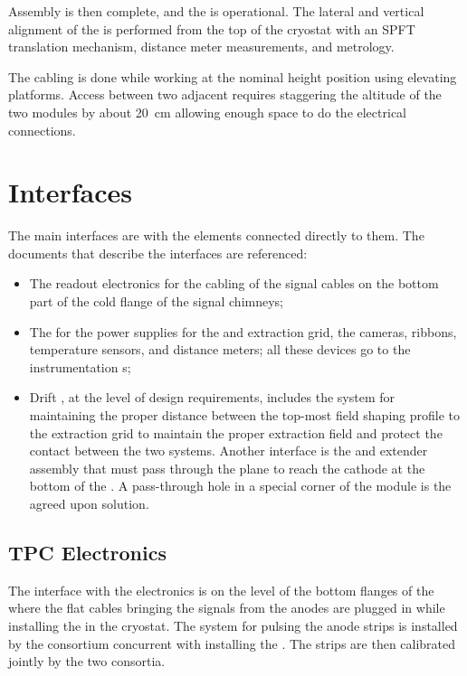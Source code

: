 Assembly is then complete, and the  is operational.
The lateral and vertical alignment of the  is performed from the top of the cryostat with an SPFT translation mechanism, distance meter measurements, and metrology.

The cabling is done while working at the nominal height position using elevating platforms. Access between two adjacent  requires staggering the altitude of the two modules by about \SI{20}{cm} allowing enough space to do the electrical connections. 

\section{Interfaces}
\label{sec:dp-crp-interfaces}

The main  interfaces are with the elements connected directly to them. The documents that describe the interfaces are referenced:
\begin{itemize}
\item The readout electronics for the cabling of the signal cables on the bottom part of the cold 
flange of the signal chimneys; 
\item The  for the power supplies for the  and extraction grid, the cameras,  ribbons, temperature sensors, and distance meters; all these devices go to the  instrumentation \fdth{}s; 

\item Drift , at the level of design requirements, includes the system for maintaining the proper distance between the top-most field shaping profile to the extraction grid to maintain the proper extraction field and protect the contact between the two systems. Another interface is the  \fdth{} and extender assembly that must pass through the  plane to reach the cathode at the bottom of the .  A pass-through hole in a special corner of the  module is the agreed upon solution.
\end{itemize}

\subsection{TPC Electronics}
\label{sec:dp-crp-intfc-elec}

The interface with the   electronics is on the level of the bottom flanges of the  where the flat cables bringing the signals from the anodes are plugged in while installing the  in the cryostat. The system for 
pulsing the anode strips is installed by the  consortium 
concurrent with installing the . 
The strips are then calibrated jointly by the two consortia.

